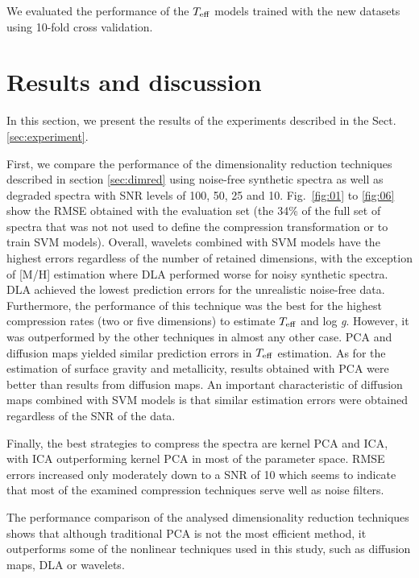 \documentclass[a4paper,fleqn,usenatbib]{mnras}
\begin{document}
{{{We evaluated the performance of the $T_{\rm eff}$ models trained with
the new datasets using 10-fold cross validation.

\section{Results and discussion}
\label{sec:results}
In this section, we present the results of the experiments 
  described in the Sect. \ref{sec:experiment}.

First, we compare the performance of the dimensionality reduction
techniques described in section \ref{sec:dimred} using noise-free
synthetic spectra as well as degraded spectra with SNR levels of 100,
50, 25 and 10.  Fig.~\ref{fig:01} to \ref{fig:06} show the
RMSE obtained with the evaluation set (the 34\% of the full set of
spectra that was not not used to define the compression transformation
or to train SVM models). Overall, wavelets combined with SVM
models have the highest errors regardless of the number of retained
dimensions, with the exception of [M/H] estimation where DLA performed 
worse for noisy synthetic spectra. DLA achieved the lowest prediction 
errors for the unrealistic noise-free data. Furthermore, the performance 
of this technique was the best for the highest compression rates 
(two or five dimensions) to estimate $T_{\rm eff}$ and 
log \textit{g}. However, it was outperformed by the other techniques 
in almost any other case. PCA and diffusion maps yielded similar 
prediction errors in $T_{\rm eff}$ estimation. As for the estimation 
of surface gravity and metallicity, results obtained with PCA 
were better than results from diffusion maps. An important 
characteristic of diffusion maps combined with SVM models is that 
similar estimation errors were obtained regardless of the SNR of 
the data.

Finally, the best strategies to compress the spectra are kernel PCA 
and ICA, with ICA outperforming kernel PCA in most of the parameter
space. RMSE errors increased only moderately down to a SNR of 10
which seems to indicate that most of the examined compression
techniques serve well as noise filters.

The performance comparison of the analysed dimensionality reduction
techniques shows that although traditional PCA is not the most
efficient method, it outperforms some of the nonlinear techniques used
in this study, such as diffusion maps, DLA or wavelets.


}}}
\end{document}
